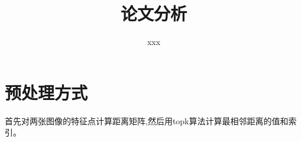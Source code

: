 \documentclass[10pt,a4paper]{article}
\title{论文分析}
\author{xxx}
\begin{document}
\maketitle %
\tableofcontents %

\section{预处理方式}
首先对两张图像的特征点计算距离矩阵,然后用topk算法计算最相邻距离的值和索引。
\end{document}

